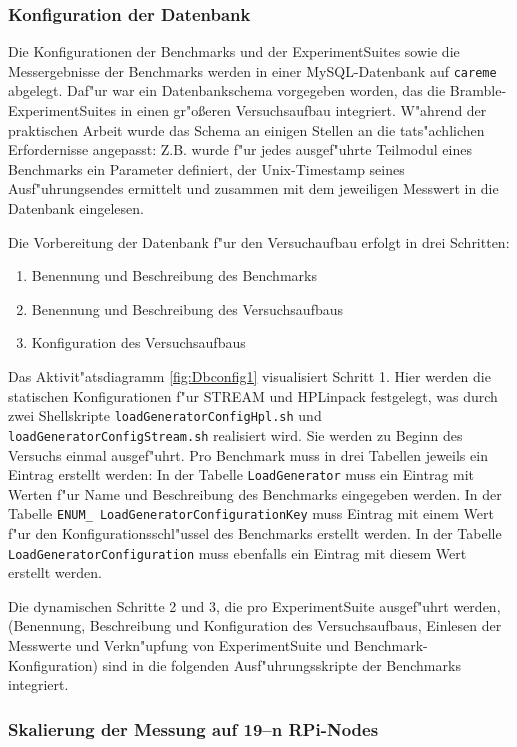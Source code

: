 \subsubsection{Konfiguration der Datenbank}

Die Konfigurationen der Benchmarks und der ExperimentSuites sowie die Messergebnisse der Benchmarks werden in einer MySQL-Datenbank auf \texttt{careme} abgelegt. Daf"ur war ein Datenbankschema vorgegeben worden, das die Bramble-ExperimentSuites in einen gr"o\ss eren Versuchsaufbau integriert. W"ahrend der praktischen Arbeit wurde das Schema an einigen Stellen an die tats"achlichen Erfordernisse angepasst: Z.B. wurde f"ur jedes ausgef"uhrte Teilmodul eines Benchmarks ein Parameter definiert, der Unix-Timestamp seines Ausf"uhrungsendes ermittelt und zusammen mit dem jeweiligen Messwert in die Datenbank eingelesen.

Die Vorbereitung der Datenbank f"ur den Versuchaufbau erfolgt in drei Schritten:  
\begin{enumerate}
	\item Benennung und Beschreibung des Benchmarks 
	\item Benennung und Beschreibung des Versuchsaufbaus 
	\item Konfiguration des Versuchsaufbaus 
\end{enumerate} 
Das Aktivit"atsdiagramm \ref{fig:Dbconfig1} visualisiert Schritt 1. Hier werden die statischen Konfigurationen f"ur STREAM und HPLinpack festgelegt, was durch zwei Shellskripte \texttt{loadGeneratorConfigHpl.sh} und \texttt{loadGenerator\-ConfigStream.sh} realisiert wird. Sie werden zu Beginn des Versuchs einmal ausgef"uhrt. Pro Benchmark muss in drei Tabellen jeweils ein Eintrag erstellt werden: In der Tabelle \texttt{LoadGenerator} muss ein Eintrag mit Werten f"ur Name und Beschreibung des Benchmarks eingegeben werden. In der Tabelle \texttt{ENUM\_ LoadGeneratorConfigurationKey} muss Eintrag mit einem Wert f"ur den Konfigurationsschl"ussel des Benchmarks erstellt werden. In der Tabelle \texttt{LoadGeneratorConfiguration} muss ebenfalls ein Eintrag mit diesem Wert erstellt werden.

Die dynamischen Schritte 2 und 3, die pro ExperimentSuite ausgef"uhrt werden, (Benennung, Beschreibung und Konfiguration des Versuchsaufbaus, Einlesen der Messwerte und Verkn"upfung von ExperimentSuite und  Benchmark-Konfiguration) sind in die folgenden Ausf"uhrungsskripte der Benchmarks integriert. 

\subsubsection{Skalierung der Messung auf 19--n RPi-Nodes} 


